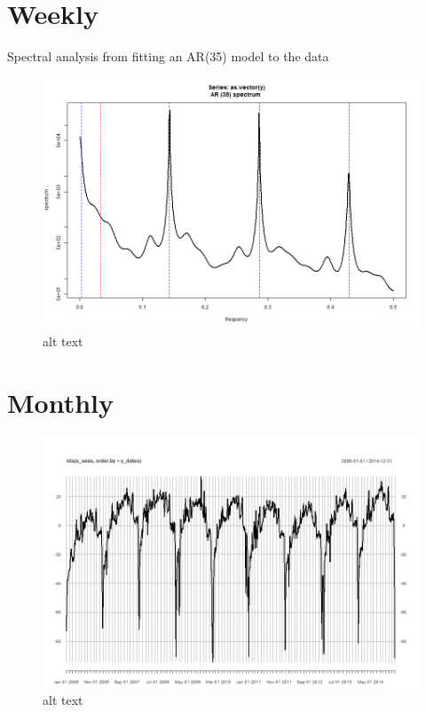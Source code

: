 \documentclass[11pt]{article}
\makeatletter
\def\maxwidth{\ifdim\Gin@nat@width>\linewidth\linewidth
    \else\Gin@nat@width\fi}
\let\Oldincludegraphics\includegraphics
\renewcommand{\includegraphics}[1]{\Oldincludegraphics[width=.8\maxwidth]{#1}}
\makeatother
\begin{document}
    \section{Weekly}\label{weekly}

Spectral analysis from fitting an AR(35) model to the data

\begin{figure}[htbp]
\centering
\includegraphics{images/spectral analysis.png}
\caption{alt text}
\end{figure}

    \section{Monthly}\label{monthly}

\begin{figure}[htbp]
\centering
\includegraphics{images/monthly 2.png}
\caption{alt text}
\end{figure}
\end{document}
